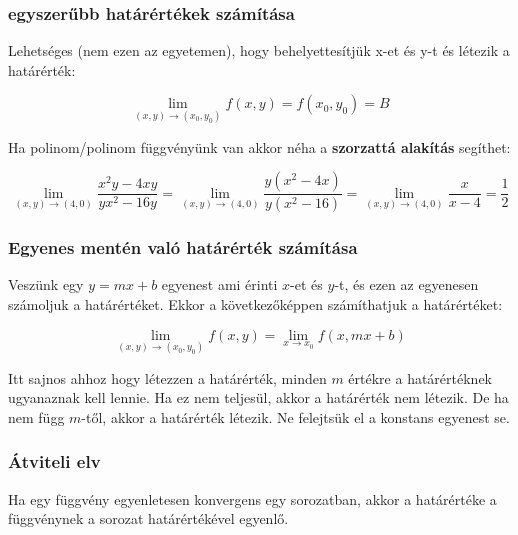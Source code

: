 \documentclass{article}
\begin{document}
\subsubsection{egyszerűbb határértékek számítása}

Lehetséges (nem ezen az egyetemen), hogy behelyettesítjük x-et és y-t és létezik a határérték:

\begin{equation*}
    \lim_{(x,y) \to (x_0, y_0)} f(x,y) = f(x_0, y_0)  =B
\end{equation*}

\vspace{4mm}

Ha polinom/polinom függvényünk van ak\-kor né\-ha a \textbf{szor\-zattá a\-lak\-ít\-ás} se\-gít\-het:

\begin{equation*}
    \lim_{(x,y) \to (4, 0)} \frac{x^2 y -4xy}{yx^2 -16y} = \lim_{(x,y) \to (4, 0)} \frac{y(x^2-4x)}{y(x^2 -16)} = \lim_{(x,y) \to (4, 0)} \frac{x}{x-4} = \frac{1}{2}
\end{equation*}

\subsubsection{Egyenes mentén való határérték számítása}

Veszünk egy $y = mx + b$ egyenest ami érinti $x$-et és $y$-t, és ezen az egyenesen szá\-mol\-juk a határ\-ér\-téket. Ek\-kor a kö\-vet\-ke\-ző\-kép\-pen számíthatjuk a határértéket:

\begin{equation*}
    \lim_{(x,y) \to (x_0, y_0)} f(x,y) = \lim_{x \to x_0} f(x, mx + b)
\end{equation*}

Itt sajnos ahhoz hogy létezzen a határérték, minden $m$ értékre a ha\-tár\-ér\-ték\-nek ugyanaznak kell lennie. Ha ez nem teljesül, akkor a határérték nem létezik. 
De ha nem függ $m$-től, akkor a határérték létezik. Ne felejtsük el a konstans egyenest se.


\subsubsection{Átviteli elv}

Ha egy függvény egyenletesen konvergens egy sorozatban, akkor a határértéke a függvénynek a sorozat határértékével egyenlő.
\end{document}
